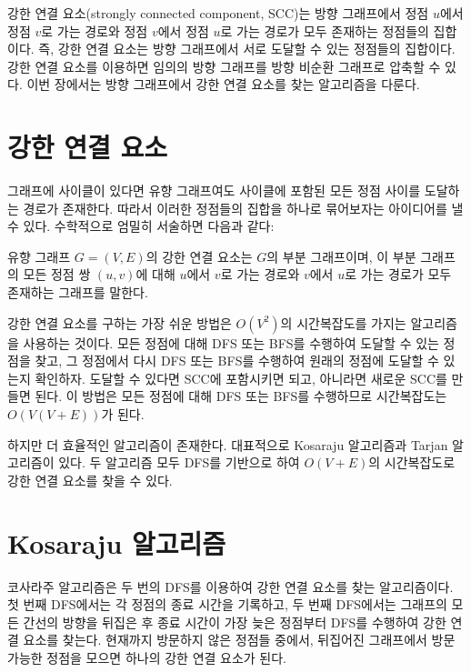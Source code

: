 강한 연결 요소(strongly connected component, SCC)는 방향 그래프에서 정점 $u$에서 정점 $v$로 가는 경로와 정점 $v$에서 정점 $u$로 가는 경로가 모두 존재하는 정점들의 집합이다. 즉, 강한 연결 요소는 방향 그래프에서 서로 도달할 수 있는 정점들의 집합이다. 강한 연결 요소를 이용하면 임의의 방향 그래프를 방향 비순환 그래프로 압축할 수 있다. 이번 장에서는 방향 그래프에서 강한 연결 요소를 찾는 알고리즘을 다룬다.

\section{강한 연결 요소}
그래프에 사이클이 있다면 유향 그래프여도 사이클에 포함된 모든 정점 사이를 도달하는 경로가 존재한다. 따라서 이러한 정점들의 집합을 하나로 묶어보자는 아이디어를 낼 수 있다. 수학적으로 엄밀히 서술하면 다음과 같다:

\begin{definition}[강한 연결 요소]
    유향 그래프 $G=(V, E)$의 강한 연결 요소는 $G$의 부분 그래프이며, 이 부분 그래프의 모든 정점 쌍 $(u, v)$에 대해 $u$에서 $v$로 가는 경로와 $v$에서 $u$로 가는 경로가 모두 존재하는 그래프를 말한다.
\end{definition}

강한 연결 요소를 구하는 가장 쉬운 방법은 $O(V^2)$의 시간복잡도를 가지는 알고리즘을 사용하는 것이다. 모든 정점에 대해 DFS 또는 BFS를 수행하여 도달할 수 있는 정점을 찾고, 그 정점에서 다시 DFS 또는 BFS를 수행하여 원래의 정점에 도달할 수 있는지 확인하자. 도달할 수 있다면 SCC에 포함시키면 되고, 아니라면 새로운 SCC를 만들면 된다. 이 방법은 모든 정점에 대해 DFS 또는 BFS를 수행하므로 시간복잡도는 $O(V(V+E))$가 된다.

하지만 더 효율적인 알고리즘이 존재한다. 대표적으로 Kosaraju 알고리즘과 Tarjan 알고리즘이 있다. 두 알고리즘 모두 DFS를 기반으로 하여 $O(V+E)$의 시간복잡도로 강한 연결 요소를 찾을 수 있다.

\section{Kosaraju 알고리즘}
코사라주 알고리즘은 두 번의 DFS를 이용하여 강한 연결 요소를 찾는 알고리즘이다. 첫 번째 DFS에서는 각 정점의 종료 시간을 기록하고, 두 번째 DFS에서는 그래프의 모든 간선의 방향을 뒤집은 후 종료 시간이 가장 늦은 정점부터 DFS를 수행하여 강한 연결 요소를 찾는다. 현재까지 방문하지 않은 정점들 중에서, 뒤집어진 그래프에서 방문 가능한 정점을 모으면 하나의 강한 연결 요소가 된다.

